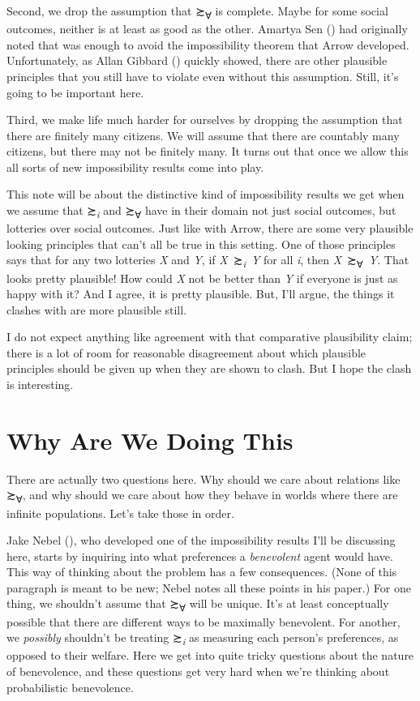 \documentclass[
  11pt,
  letterpaper,
  DIV=11,
  numbers=noendperiod,
  twoside]{scrartcl}
\begin{document}
Second, we drop the assumption that ≿\textsubscript{∀} is complete.
Maybe for some social outcomes, neither is at least as good as the
other. Amartya Sen () had
originally noted that was enough to avoid the impossibility theorem that
Arrow developed. Unfortunately, as Allan Gibbard
() quickly showed, there are other
plausible principles that you still have to violate even without this
assumption. Still, it's going to be important here.

Third, we make life much harder for ourselves by dropping the assumption
that there are finitely many citizens. We will assume that there are
countably many citizens, but there may not be finitely many. It turns
out that once we allow this all sorts of new impossibility results come
into play.

This note will be about the distinctive kind of impossibility results we
get when we assume that ≿\textsubscript{\emph{i}} and ≿\textsubscript{∀}
have in their domain not just social outcomes, but lotteries over social
outcomes. Just like with Arrow, there are some very plausible looking
principles that can't all be true in this setting. One of those
principles says that for any two lotteries \emph{X} and \emph{Y}, if
\emph{X}~≿\textsubscript{\emph{i}}~\emph{Y} for all \emph{i}, then
\emph{X}~≿\textsubscript{∀}~\emph{Y}. That looks pretty plausible! How
could \emph{X} not be better than \emph{Y} if everyone is just as happy
with it? And I agree, it is pretty plausible. But, I'll argue, the
things it clashes with are more plausible still.

I do not expect anything like agreement with that comparative
plausibility claim; there is a lot of room for reasonable disagreement
about which plausible principles should be given up when they are shown
to clash. But I hope the clash is interesting.

\section{Why Are We Doing This}\label{sec-why}

There are actually two questions here. Why should we care about
relations like ≿\textsubscript{∀}, and why should we care about how they
behave in worlds where there are infinite populations. Let's take those
in order.

Jake Nebel (), who developed one of the
impossibility results I'll be discussing here, starts by inquiring into
what preferences a \emph{benevolent} agent would have. This way of
thinking about the problem has a few consequences. (None of this
paragraph is meant to be new; Nebel notes all these points in his
paper.) For one thing, we shouldn't assume that ≿\textsubscript{∀} will
be unique. It's at least conceptually possible that there are different
ways to be maximally benevolent. For another, we \emph{possibly}
shouldn't be treating ≿\textsubscript{\emph{i}} as measuring each
person's preferences, as opposed to their welfare. Here we get into
quite tricky questions about the nature of benevolence, and these
questions get very hard when we're thinking about probabilistic
benevolence.
\end{document}
